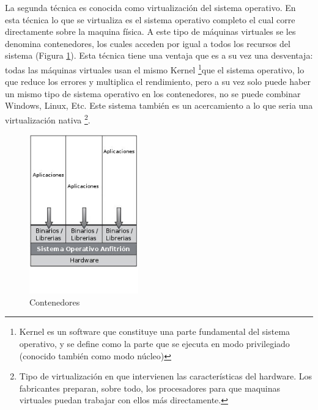\documentclass[conference, spanish]{IEEEtran}
\begin{document}

\newpage
La segunda técnica es conocida como virtualización del sistema operativo. En esta técnica lo que se virtualiza es el sistema operativo completo el cual corre directamente sobre la maquina física. A este tipo de máquinas virtuales se les denomina contenedores, los cuales acceden por igual a todos los recursos del sistema (Figura \ref{fig:contenedores}). Esta técnica tiene una ventaja que es a su vez una desventaja: todas las máquinas virtuales usan el mismo Kernel \footnote{Kernel es un software que constituye una parte fundamental del sistema operativo, y se define como la parte que se ejecuta en modo privilegiado (conocido también como modo núcleo)}que el sistema operativo, lo que reduce los errores y multiplica el rendimiento, pero a su vez solo puede haber un mismo tipo de sistema operativo en los contenedores, no se puede combinar Windows, Linux, Etc. Este sistema también es un acercamiento a lo que seria una virtualización nativa \footnote{Tipo de virtualización en que intervienen las características del hardware. Los fabricantes preparan, sobre todo, los procesadores para que maquinas virtuales puedan trabajar con ellos más directamente.}.\\

\begin{figure}[h]
    \centering
  \caption{Contenedores}
  \label{fig:contenedores}
  \includegraphics[width = 0.42\textwidth]{../architecture/v1/diagrams/contenedores}
\end{figure}
\end{document}

